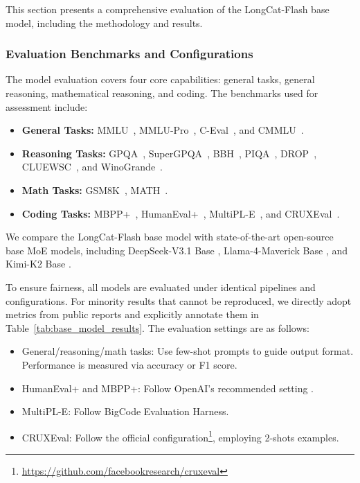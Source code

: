 \documentclass{article}
\newcommand{\longcat}{LongCat-Flash\xspace}
\begin{document}
This section presents a comprehensive evaluation of the \longcat base model, including the methodology and results.

\subsubsection{Evaluation Benchmarks and Configurations}
The model evaluation covers four core capabilities: general tasks, general reasoning, mathematical reasoning, and coding. The benchmarks used for assessment include:

\begin{itemize}
    \item \textbf{General Tasks:} MMLU~\citep{hendrycks2021measuringmassivemultitasklanguage}, MMLU-Pro~\citep{wang2024mmluprorobustchallengingmultitask}, C-Eval~\citep{huang2023ceval}, and CMMLU~\citep{li2023cmmlu}.

    \item \textbf{Reasoning Tasks:} GPQA~\citep{rein2023gpqagraduatelevelgoogleproofqa}, SuperGPQA~\citep{pteam2025supergpqascalingllmevaluation}, BBH~\citep{BBH}, PIQA~\citep{piqa}, DROP~\citep{drop}, CLUEWSC~\citep{clue}, and WinoGrande~\citep{winogrande}.
    
    \item \textbf{Math Tasks:} GSM8K~\citep{cobbe2021gsm8k}, MATH~\citep{mathbenchmark}.

    \item \textbf{Coding Tasks:} MBPP+~\citep{humanevalmbppplus}, HumanEval+~\citep{humanevalmbppplus}, MultiPL-E~\citep{cassano2022multiplescalableextensibleapproach}, and CRUXEval~\citep{gu2024cruxevalbenchmarkcodereasoning}. 
\end{itemize}

We compare the \longcat base model with state-of-the-art open-source base MoE models, including DeepSeek-V3.1 Base \citep{deepseekai2025deepseekv3technicalreport}, Llama-4-Maverick Base \citep{meta2025llama4}, and Kimi-K2 Base \citep{Kimi_K2_web_doc}.

To ensure fairness, all models are evaluated under identical pipelines and configurations. For minority results that cannot be reproduced, we directly adopt metrics from public reports and explicitly annotate them in Table~\ref{tab:base_model_results}. The evaluation settings are as follows:

\begin{itemize}
\item General/reasoning/math tasks: Use few-shot prompts to guide output format. Performance is measured via accuracy or F1 score.

\item HumanEval+ and MBPP+: Follow OpenAI's recommended setting \citep{chen2021codex}.

\item MultiPL-E: Follow BigCode Evaluation Harness\citep{bigcode-evaluation-harness}.
\item CRUXEval: Follow the official configuration\footnote{\url{https://github.com/facebookresearch/cruxeval}}, employing 2-shots examples.

\end{itemize}
\end{document}
